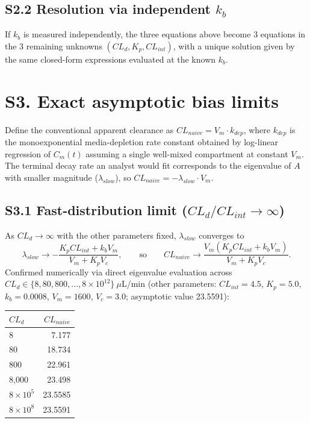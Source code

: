 \documentclass[11pt]{article}
\begin{document}
\subsection*{S2.2 Resolution via independent $k_b$}

If $k_b$ is measured independently, the three equations above become 3 equations in the 3 remaining unknowns $(CL_d, K_p, CL_{int})$, with a unique solution given by the same closed-form expressions evaluated at the known $k_b$.

\section*{S3. Exact asymptotic bias limits}

Define the conventional apparent clearance as $CL_{naive} = V_m \cdot k_{dep}$, where $k_{dep}$ is the monoexponential media-depletion rate constant obtained by log-linear regression of $C_m(t)$ assuming a single well-mixed compartment at constant $V_m$. The terminal decay rate an analyst would fit corresponds to the eigenvalue of $A$ with smaller magnitude ($\lambda_{slow}$), so $CL_{naive} = -\lambda_{slow}\cdot V_m$.

\subsection*{S3.1 Fast-distribution limit ($CL_d/CL_{int}\to\infty$)}

As $CL_d\to\infty$ with the other parameters fixed, $\lambda_{slow}$ converges to
\[
\lambda_{slow} \to -\frac{K_p CL_{int}+k_bV_m}{V_m+K_pV_c}, \qquad\text{so}\qquad CL_{naive} \to \frac{V_m(K_pCL_{int}+k_bV_m)}{V_m+K_pV_c}.
\]
Confirmed numerically via direct eigenvalue evaluation across $CL_d \in \{8, 80, 800, \dots, 8\times10^{12}\}\ \mu$L/min (other parameters: $CL_{int}=4.5$, $K_p=5.0$, $k_b=0.0008$, $V_m=1600$, $V_c=3.0$; asymptotic value 23.5591):

\begin{table}[h]
\centering
\begin{tabular}{@{}lr@{}}
\toprule
$CL_d$ & $CL_{naive}$ \\
\midrule
8 & 7.177 \\
80 & 18.734 \\
800 & 22.961 \\
8{,}000 & 23.498 \\
$8\times10^5$ & 23.5585 \\
$8\times10^8$ & 23.5591 \\
\bottomrule
\end{tabular}
\end{table}
\end{document}
